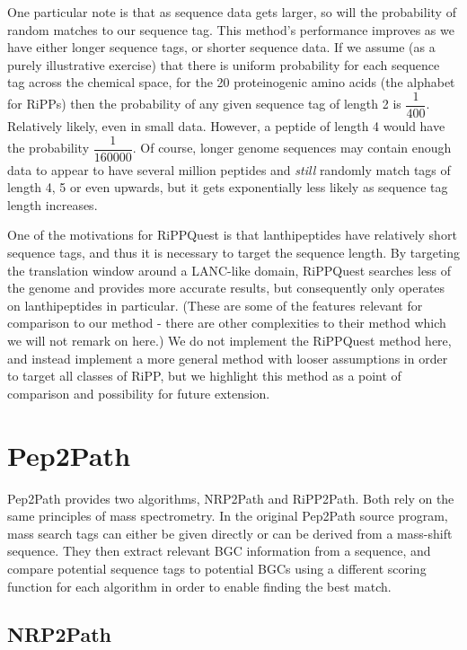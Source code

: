 \documentclass{l4proj}
\newcommand{\cit}[1]{\citep{#1}}
\begin{document}
One particular note is that as sequence data gets larger, so will the probability of random matches to our sequence tag. This method's performance improves as we have either longer sequence tags, or shorter sequence data. If we assume (as a purely illustrative exercise) that there is uniform probability for each sequence tag across the chemical space, for the 20 proteinogenic amino acids (the alphabet for RiPPs) then the probability of any given sequence tag of length 2 is \(\dfrac{1}{400}\). Relatively likely, even in small data. However, a peptide of length 4 would have the probability \(\dfrac{1}{160000}\). Of course, longer genome sequences may contain enough data to appear to have several million peptides and \textit{still} randomly match tags of length 4, 5 or even upwards, but it gets exponentially less likely as sequence tag length increases.

One of the motivations for RiPPQuest is that lanthipeptides have relatively short sequence tags, and thus it is necessary to target the sequence length. By targeting the translation window around a LANC-like domain, RiPPQuest searches less of the genome and provides more accurate results, but consequently only operates on lanthipeptides in particular. (These are some of the features relevant for comparison to our method - there are other complexities to their method which we will not remark on here.) We do not implement the RiPPQuest method here, and instead implement a more general method with looser assumptions in order to target all classes of RiPP, but we highlight this method as a point of comparison and possibility for future extension.

\section{Pep2Path}

Pep2Path \cit{p2p} provides two algorithms, NRP2Path and RiPP2Path. Both rely on the same principles of mass spectrometry. In the original Pep2Path source program, mass search tags can either be given directly or can be derived from a mass-shift sequence. They then extract relevant BGC information from a sequence, and compare potential sequence tags to potential BGCs using a different scoring function for each algorithm in order to enable finding the best match.

\subsection{NRP2Path} \label{nrpbackground}
\end{document}
